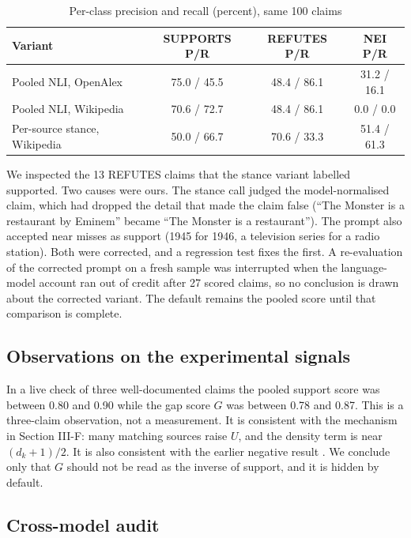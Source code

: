 \documentclass[conference]{IEEEtran}
\begin{document}
\begin{table}[t]
\caption{Per-class precision and recall (percent), same 100 claims}
\centering
\footnotesize
\begin{tabular}{lccc}
\toprule
Variant & SUPPORTS P/R & REFUTES P/R & NEI P/R \\
\midrule
Pooled NLI, OpenAlex & 75.0 / 45.5 & 48.4 / 86.1 & 31.2 / 16.1 \\
Pooled NLI, Wikipedia & 70.6 / 72.7 & 48.4 / 86.1 & 0.0 / 0.0 \\
Per-source stance, Wikipedia & 50.0 / 66.7 & 70.6 / 33.3 & 51.4 / 61.3 \\
\bottomrule
\end{tabular}
\par\vspace{2pt}{\scriptsize P: precision. R: recall. Class sizes are 33 SUPPORTS, 36 REFUTES and 31 NEI.}
\end{table}

We inspected the 13 REFUTES claims that the stance variant labelled supported. Two causes were ours. The stance call judged the model-normalised claim, which had dropped the detail that made the claim false (``The Monster is a restaurant by Eminem'' became ``The Monster is a restaurant''). The prompt also accepted near misses as support (1945 for 1946, a television series for a radio station). Both were corrected, and a regression test fixes the first. A re-evaluation of the corrected prompt on a fresh sample was interrupted when the language-model account ran out of credit after 27 scored claims, so no conclusion is drawn about the corrected variant. The default remains the pooled score until that comparison is complete.

\subsection{Observations on the experimental signals}

In a live check of three well-documented claims the pooled support score was between 0.80 and 0.90 while the gap score $G$ was between 0.78 and 0.87. This is a three-claim observation, not a measurement. It is consistent with the mechanism in Section III-F: many matching sources raise $U$, and the density term is near $(d_k+1)/2$. It is also consistent with the earlier negative result \cite{ss2026}. We conclude only that $G$ should not be read as the inverse of support, and it is hidden by default.

\subsection{Cross-model audit}
\end{document}
